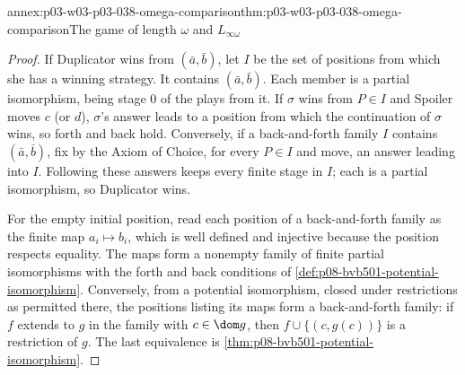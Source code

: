 \begin{annexitem}{annex:p03-w03-p03-038-omega-comparison}{thm:p03-w03-p03-038-omega-comparison}{The game of length \(\omega\) and \(L_{\infty\omega}\)}
\begin{proof}
If Duplicator wins from \((\bar a,\bar b)\), let \(I\) be the set of
positions from which she has a winning strategy. It contains
\((\bar a,\bar b)\). Each member is a partial isomorphism, being stage
\(0\) of the plays from it. If \(\sigma\) wins from \(P\in I\) and Spoiler
moves \(c\) (or \(d\)), \(\sigma\)'s answer leads to a position from which
the continuation of \(\sigma\) wins, so forth and back hold. Conversely, if
a back-and-forth family \(I\) contains \((\bar a,\bar b)\), fix by the Axiom
of Choice, for every \(P\in I\) and move, an answer leading into \(I\).
Following these answers keeps every finite stage in \(I\); each is a
partial isomorphism, so Duplicator wins.

For the empty initial position, read each position of a back-and-forth
family as the finite map \(a_i\mapsto b_i\), which is well defined and
injective because the position respects equality. The maps form a nonempty
family of finite partial isomorphisms with the forth and back conditions of
\cref{def:p08-bvb501-potential-isomorphism}. Conversely, from a potential
isomorphism, closed under restrictions as permitted there, the positions
listing its maps form a back-and-forth family: if \(f\) extends to \(g\) in
the family with \(c\in\dom g\), then
\(f\cup\{(c,g(c))\}\) is a restriction of \(g\). The last equivalence is
\cref{thm:p08-bvb501-potential-isomorphism}.
\end{proof}
\end{annexitem}

